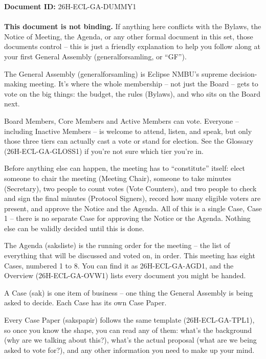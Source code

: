 \documentclass{../../../Common/Latex/Templates/rapport}
\date{\meetingdate, \meetingtime}
\begin{document}
\makecoverpage
\tableofcontents
\reportmainmatter

\noindent\textbf{Document ID:} 26H-ECL-GA-DUMMY1\\
\meetingline\\
\textbf{This document is not binding.} If anything here conflicts with the Bylaws, the Notice of Meeting, the Agenda, or any other formal document in this set, those documents control -- this is just a friendly explanation to help you follow along at your first General Assembly (generalforsamling, or ``GF'').

The General Assembly (generalforsamling) is Eclipse NMBU's supreme decision-making meeting. It's where the whole membership -- not just the Board -- gets to vote on the big things: the budget, the rules (Bylaws), and who sits on the Board next.

Board Members, Core Members and Active Members can vote. Everyone -- including Inactive Members -- is welcome to attend, listen, and speak, but only those three tiers can actually cast a vote or stand for election. See the Glossary (26H-ECL-GA-GLOSS1) if you're not sure which tier you're in.

Before anything else can happen, the meeting has to ``constitute'' itself: elect someone to chair the meeting (Meeting Chair), someone to take minutes (Secretary), two people to count votes (Vote Counters), and two people to check and sign the final minutes (Protocol Signers), record how many eligible voters are present, and approve the Notice and the Agenda. All of this is a single Case, Case 1 -- there is no separate Case for approving the Notice or the Agenda. Nothing else can be validly decided until this is done.

The Agenda (saksliste) is the running order for the meeting -- the list of everything that will be discussed and voted on, in order. This meeting has eight Cases, numbered 1 to 8. You can find it as 26H-ECL-GA-AGD1, and the Overview (26H-ECL-GA-OVW1) lists every document you might be handed.

A Case (sak) is one item of business -- one thing the General Assembly is being asked to decide. Each Case has its own Case Paper.

Every Case Paper (sakspapir) follows the same template (26H-ECL-GA-TPL1), so once you know the shape, you can read any of them: what's the background (why are we talking about this?), what's the actual proposal (what are we being asked to vote for?), and any other information you need to make up your mind.
\end{document}
